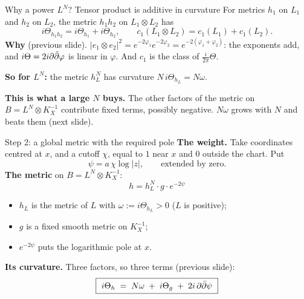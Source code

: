 \begin{frame}{Why a power \(L^N\)? Tensor product is additive in curvature}
\label{fr:why-power}
For metrics \(h_1\) on \(L_1\) and \(h_2\) on \(L_2\), the metric \(h_1h_2\) on \(L_1\otimes L_2\) has
\[
\boxed{i\Theta_{h_1h_2}=i\Theta_{h_1}+i\Theta_{h_2},\qquad c_1(L_1\otimes L_2)=c_1(L_1)+c_1(L_2).}
\]
\textbf{Why} (previous slide). \(|e_1\otimes e_2|^2=e^{-2\varphi_1}e^{-2\varphi_2}=e^{-2(\varphi_1+\varphi_2)}\): the exponents add, and \(i\Theta=2i\partial\bar\partial\varphi\) is linear in \(\varphi\). And \(c_1\) is the class of \(\frac{i}{2\pi}\Theta\).
\par\bigskip
\textbf{So for \(L^N\):} the metric \(h_L^N\) has curvature \(N\,i\Theta_{h_L}=N\omega\).
\par\bigskip
\textbf{This is what a large \(N\) buys.} The other factors of the metric on \(B=L^N\otimes K_X^{-1}\) contribute fixed terms, possibly negative. \(N\omega\) grows with \(N\) and beats them (next slide).
\end{frame}


\begin{frame}{Step 2: a global metric with the required pole}
\label{fr:global-metric}
\textbf{The weight.} Take coordinates centred at \(x\), and a cutoff \(\chi\), equal to \(1\) near \(x\) and \(0\) outside the chart. Put
\[
\psi=a\,\chi\log|z| ,\qquad\text{extended by zero.}
\]
\textbf{The metric} on \(B=L^N\otimes K_X^{-1}\):
\[
h=h_L^N\cdot g\cdot e^{-2\psi}
\]
\begin{itemize}
\item \(h_L\) is the metric of \(L\) with \(\omega:=i\Theta_{h_L}>0\) (\(L\) is positive);
\item \(g\) is a fixed smooth metric on \(K_X^{-1}\);
\item \(e^{-2\psi}\) puts the logarithmic pole at \(x\).
\end{itemize}
\par\medskip
\textbf{Its curvature.} Three factors, so three terms (previous slide):
\[
\boxed{\ i\Theta_h\;=\;N\omega\;+\;i\Theta_g\;+\;2i\,\partial\db\psi\ }
\]
\end{frame}


